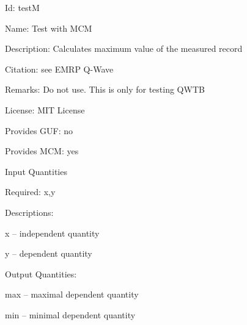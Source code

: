 \begin{tightdesc}
\item [Id:] testM
\item [Name:] Test with MCM
\item [Description:] Calculates maximum value of the measured record
\item [Citation:] see EMRP Q-Wave
\item [Remarks:] Do not use. This is only for testing QWTB
\item [License:] MIT License
\item [Provides GUF:] no
\item [Provides MCM:] yes
\item [Input Quantities] \rule{0em}{0em}
    \begin{tightdesc}
    \item [Required:] 
        \textsf{x},\enspace \textsf{y}
    \item [Descriptions:] \rule{0em}{0em}
        \begin{tightdesc}
            \item[\textsf{x}] -- independent quantity
            \item[\textsf{y}] -- dependent quantity
        \end{tightdesc}
    \end{tightdesc}
\item [Output Quantities:] \rule{0em}{0em}
    \begin{tightdesc}
        \item[\textsf{max}] -- maximal dependent quantity
        \item[\textsf{min}] -- minimal dependent quantity
    \end{tightdesc}
\end{tightdesc}
